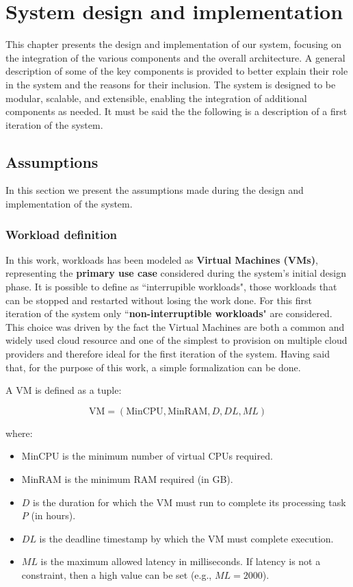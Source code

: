 \chapter{System design and implementation}
\label{cha:design}

This chapter presents the design and implementation of our system, focusing on the integration of the various components and the overall architecture. 
A general description of some of the key components is provided to better explain their role in the system and the reasons for their inclusion.
The system is designed to be modular, scalable, and extensible, enabling the integration of additional components as needed.
It must be said the the following is a description of a first iteration of the system. 

\section{Assumptions}

In this section we present the assumptions made during the design and implementation of the system. 

\subsection{Workload definition}
In this work, workloads has been modeled as \textbf{Virtual Machines (VMs)}, representing the \textbf{primary use case} considered during the system's initial design phase. 
It is possible to define as ``interrupible workloads", those workloads that can be stopped and restarted without losing the work done. 
For this first iteration of the system only ``\textbf{non-interruptible workloads}" are considered.
This choice was driven by the fact the Virtual Machines are both a common and widely used cloud resource and one of the simplest to provision on multiple cloud providers and therefore ideal for the first iteration of the system.
Having said that, for the purpose of this work, a simple formalization can be done.

A VM is defined as a tuple:

\[
\text{VM} = (\text{MinCPU}, \text{MinRAM}, D, DL, ML)
\]

where:
\begin{itemize}[itemsep=0.2pt, topsep=1pt]
    \item \( \text{MinCPU} \) is the minimum number of virtual CPUs required.
    \item \( \text{MinRAM} \) is the minimum RAM required (in GB).
    \item \( D \) is the duration for which the VM must run to complete its processing task \( P \) (in hours).
    \item \( DL \) is the deadline timestamp by which the VM must complete execution.
    \item \( ML \) is the maximum allowed latency in milliseconds. If latency is not a constraint, then a high value can be set (e.g., \( ML = 2000 \)). \\
\end{itemize}

